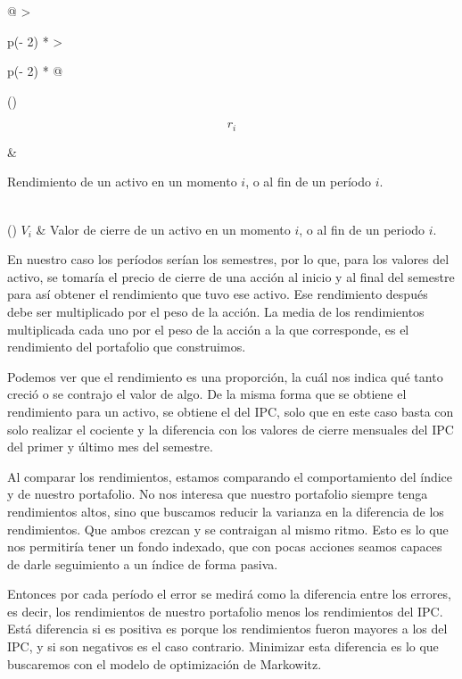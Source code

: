\documentclass[
]{article}
\begin{document}
\begin{longtable}[]{@{}
>{\raggedright\arraybackslash}p{(\columnwidth - 2\tabcolsep) * }
>{\raggedright\arraybackslash}p{(\columnwidth - 2\tabcolsep) * }@{}}
\toprule()
\begin{minipage}[b]{\linewidth}\raggedright
\[r_{i}\]
\end{minipage} & \begin{minipage}[b]{\linewidth}\raggedright
Rendimiento de un activo en un momento $i$, o al fin de un período $i$.
\end{minipage} \\
\midrule()
\endhead
\center \(V_{i}\) & Valor de cierre de un activo en un momento $i$, o al fin de un periodo $i$. \\

\caption{Descripción de variables para calcular el rendimiento de un activo.}
\end{longtable}

En nuestro caso los períodos serían los semestres, por lo que, para los valores del
activo, se tomaría el precio de cierre de una acción al inicio y al final del semestre
para así obtener el rendimiento que tuvo ese activo. Ese rendimiento después debe
ser multiplicado por el peso de la acción. La media de los rendimientos multiplicada
cada uno por el peso de la acción a la que corresponde, es el rendimiento del
portafolio que construimos.

Podemos ver que el rendimiento es una proporción, la cuál nos indica qué tanto
creció o se contrajo el valor de algo. De la misma forma que se obtiene el
rendimiento para un activo, se obtiene el del IPC, solo que en este caso basta con
solo realizar el cociente y la diferencia con los valores de cierre mensuales del IPC
del primer y último mes del semestre.

Al comparar los rendimientos, estamos comparando el comportamiento del índice y
de nuestro portafolio. No nos interesa que nuestro portafolio siempre tenga
rendimientos altos, sino que buscamos reducir la varianza en la diferencia de los
rendimientos. Que ambos crezcan y se contraigan al mismo ritmo. Esto es lo que
nos permitiría tener un fondo indexado, que con pocas acciones seamos capaces
de darle seguimiento a un índice de forma pasiva.

Entonces por cada período el error se medirá como la diferencia entre los errores,
es decir, los rendimientos de nuestro portafolio menos los rendimientos del
IPC. Está diferencia si es positiva es porque los rendimientos fueron mayores
a los del IPC, y si son negativos es el caso contrario. Minimizar esta diferencia
es lo que buscaremos con el modelo de optimización de Markowitz.
\end{document}
